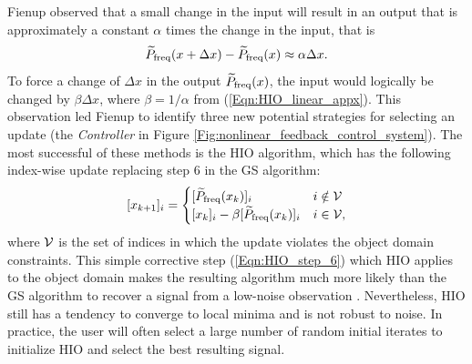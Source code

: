 Fienup observed that a small change in the input will result in an output that is approximately a constant $\alpha$ times the change in the input, that is
\begin{equation} 		\label{Eqn:HIO_linear_appx}
	\widetilde{P}_\textnormal{freq}(x + \Delta x) - \widetilde{P}_\textnormal{freq}(x) \approx \alpha \Delta x.
\end{equation}
To force a change of $\Delta x$ in the output $\widetilde{P}_\textnormal{freq}(x)$, the input would logically be changed by $\beta \Delta x$, where $\beta = 1/\alpha$ from (\ref{Eqn:HIO_linear_appx}).  This observation led Fienup to identify three new potential strategies for selecting an update (the \textit{Controller} in Figure \ref{Fig:nonlinear_feedback_control_system}).  The most successful of these methods is the HIO algorithm, which has the following index-wise update replacing step 6 in the GS algorithm:
\begin{equation} 		\label{Eqn:HIO_step_6}
[x_{k+1}]_i =
	\begin{cases}
		[\widetilde{P}_\textnormal{freq}(x_k)]_i	&	i \notin {\mathcal V}		\\
		[x_k]_i - \beta [\widetilde{P}_\textnormal{freq}(x_k)]_i			&	 i \in {\mathcal V},
	\end{cases}
\end{equation}
where ${\mathcal V}$ is the set of indices in which the update violates the object domain constraints.  This simple corrective step (\ref{Eqn:HIO_step_6}) which HIO applies to the object domain makes the resulting algorithm much more likely than the GS algorithm to recover a signal from a low-noise observation \cite{DBLP:journals/corr/JaganathanEH15a}.   Nevertheless, HIO still has a tendency to converge to local minima and is not robust to noise.  In practice, the user will often select a large number of random initial iterates to initialize HIO and select the best resulting signal.





